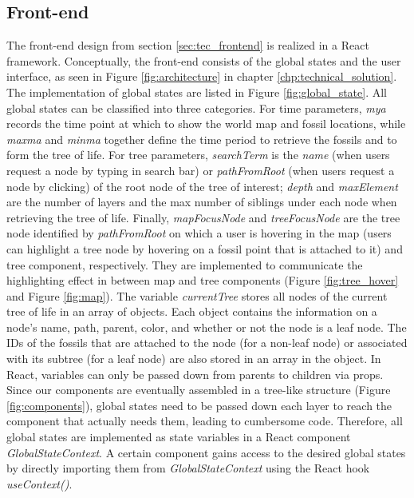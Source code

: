 \documentclass[11pt, a4paper,oneside,chapterprefix=false]{scrbook}
\begin{document}
\subsection{Front-end} \label{subsec: implementation_frontend}
The front-end design from section \ref{sec:tec_frontend} is realized in a React framework. Conceptually, the front-end consists of the global states and the user interface, as seen in Figure \ref{fig:architecture} in chapter \ref{chp:technical_solution}. The implementation of global states are listed in Figure \ref{fig:global_state}. All global states can be classified into three categories. For time parameters, \emph{mya} records the time point at which to show the world map and fossil locations, while \emph{maxma} and \emph{minma} together define the time period to retrieve the fossils and to form the tree of life. For tree parameters, \emph{searchTerm} is the \emph{name} (when users request a node by typing in search bar) or \emph{pathFromRoot} (when users request a node by clicking) of the root node of the tree of interest; \emph{depth} and \emph{maxElement} are the number of layers and the max number of siblings under each node when retrieving the tree of life. Finally, \emph{mapFocusNode} and \emph{treeFocusNode} are the tree node identified by \emph{pathFromRoot} on which a user is hovering in the map (users can highlight a tree node by hovering on a fossil point that is attached to it) and tree component, respectively. They are implemented to communicate the highlighting effect in between map and tree components (Figure \ref{fig:tree_hover} and Figure \ref{fig:map}). The variable \emph{currentTree} stores all nodes of the current tree of life in an array of objects. Each object contains the information on a node's name, path, parent, color, and whether or not the node is a leaf node. The IDs of the fossils that are attached to the node (for a non-leaf node) or associated with its subtree (for a leaf node) are also stored in an array in the object. In React, variables can only be passed down from parents to children via props. Since our components are eventually assembled in a tree-like structure (Figure \ref{fig:components}), global states need to be passed down each layer to reach the component that actually needs them, leading to cumbersome code. Therefore, all global states are implemented as state variables in a React component \emph{GlobalStateContext}. A certain component gains access to the desired global states by directly importing them from \emph{GlobalStateContext} using the React hook \emph{useContext()}. \\
\end{document}

